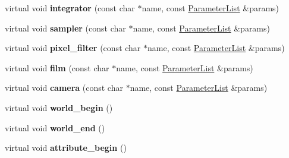 \begin{DoxyCompactItemize}
\mbox{\label{structpbrt_1_1_fermat_importer_ad9c8ec8e5e1366d8015a07eaa0f08100}} 
virtual void {\bfseries integrator} (const char $\ast$name, const \hyperlink{structpbrt_1_1_parameter_list}{Parameter\+List} \&params)
\item 
\mbox{\label{structpbrt_1_1_fermat_importer_a03f4c963396b6e188a91191c506b9674}} 
virtual void {\bfseries sampler} (const char $\ast$name, const \hyperlink{structpbrt_1_1_parameter_list}{Parameter\+List} \&params)
\item 
\mbox{\label{structpbrt_1_1_fermat_importer_a1ff854e8246ba489a1a980b0cff38944}} 
virtual void {\bfseries pixel\+\_\+filter} (const char $\ast$name, const \hyperlink{structpbrt_1_1_parameter_list}{Parameter\+List} \&params)
\item 
\mbox{\label{structpbrt_1_1_fermat_importer_adad7bdd342113af9b3d375748c3967e3}} 
virtual void {\bfseries film} (const char $\ast$name, const \hyperlink{structpbrt_1_1_parameter_list}{Parameter\+List} \&params)
\item 
\mbox{\label{structpbrt_1_1_fermat_importer_a9ada13b8a06738ebbd9beac7c07c7056}} 
virtual void {\bfseries camera} (const char $\ast$name, const \hyperlink{structpbrt_1_1_parameter_list}{Parameter\+List} \&params)
\item 
\mbox{\label{structpbrt_1_1_fermat_importer_a9f214f059c51d29ec4e32324eae148a7}} 
virtual void {\bfseries world\+\_\+begin} ()
\item 
\mbox{\label{structpbrt_1_1_fermat_importer_a66b6b89c4e09275e5e7e6a8871be91c6}} 
virtual void {\bfseries world\+\_\+end} ()
\item 
\mbox{\label{structpbrt_1_1_fermat_importer_add5090a1336cf355d38a552d53b1b752}} 
virtual void {\bfseries attribute\+\_\+begin} ()
\item 
\mbox{\label{structpbrt_1_1_fermat_importer_a197dbd0d970eba7f5881eed7ccac1fa3}} 

\end{DoxyCompactItemize}
